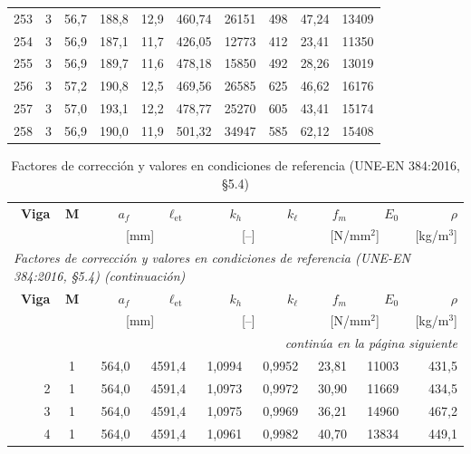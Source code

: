 \documentclass[11pt,a4paper]{article}
\newcommand{\fm}{f_{m}}
\newcommand{\Ecero}{E_{0}}
\newcommand{\lonet}{\ell_{\mathrm{et}}}   %
\begin{document}
{\begin{longtable}{r c r r r r r r r r}
253 & 3 & 56,7 & 188,8 & 12,9 & 460,74 & 26151 & 498 & 47,24 & 13409 \\
254 & 3 & 56,9 & 187,1 & 11,7 & 426,05 & 12773 & 412 & 23,41 & 11350 \\
255 & 3 & 56,9 & 189,7 & 11,6 & 478,18 & 15850 & 492 & 28,26 & 13019 \\
256 & 3 & 57,2 & 190,8 & 12,5 & 469,56 & 26585 & 625 & 46,62 & 16176 \\
257 & 3 & 57,0 & 193,1 & 12,2 & 478,77 & 25270 & 605 & 43,41 & 15174 \\
258 & 3 & 56,9 & 190,0 & 11,9 & 501,32 & 34947 & 585 & 62,12 & 15408 \\
\end{longtable}
}

{\footnotesize
\begin{longtable}{r c r r r r r r r}
\caption[Factores de corrección y valores en condiciones de referencia (UNE-EN 384:2016, \S5.4)]{Factores de corrección y valores en condiciones de referencia (UNE-EN 384:2016, \S5.4)}\label{tab:anexoB2}\\
\toprule
\textbf{Viga} & \textbf{M} & \textbf{$a_{f}$} & \textbf{$\lonet$} & \textbf{$k_{h}$} & \textbf{$k_{\ell}$} & \textbf{$\fm$} & \textbf{$\Ecero$} & \textbf{$\rho$} \\
 & & \multicolumn{2}{c}{[mm]} & \multicolumn{2}{c}{[--]} & \multicolumn{2}{c}{[N/mm$^{2}$]} & [kg/m$^{3}$] \\
\midrule
\endfirsthead
\multicolumn{9}{l}{\footnotesize\itshape Factores de corrección y valores en condiciones de referencia (UNE-EN 384:2016, \S5.4) (continuación)}\\
\toprule
\textbf{Viga} & \textbf{M} & \textbf{$a_{f}$} & \textbf{$\lonet$} & \textbf{$k_{h}$} & \textbf{$k_{\ell}$} & \textbf{$\fm$} & \textbf{$\Ecero$} & \textbf{$\rho$} \\
 & & \multicolumn{2}{c}{[mm]} & \multicolumn{2}{c}{[--]} & \multicolumn{2}{c}{[N/mm$^{2}$]} & [kg/m$^{3}$] \\
\midrule
\endhead
\midrule \multicolumn{9}{r}{\footnotesize\itshape continúa en la página siguiente}\\
\endfoot
\bottomrule
\endlastfoot
1 & 1 & 564,0 & 4591,4 & 1,0994 & 0,9952 & 23,81 & 11003 & 431,5 \\
2 & 1 & 564,0 & 4591,4 & 1,0973 & 0,9972 & 30,90 & 11669 & 434,5 \\
3 & 1 & 564,0 & 4591,4 & 1,0975 & 0,9969 & 36,21 & 14960 & 467,2 \\
4 & 1 & 564,0 & 4591,4 & 1,0961 & 0,9982 & 40,70 & 13834 & 449,1 \\

\end{longtable}}
\end{document}
